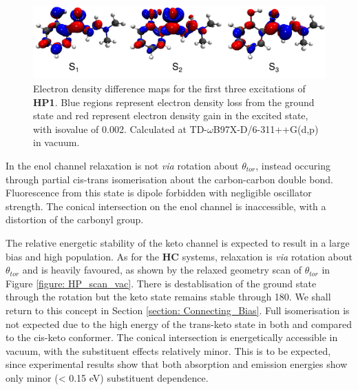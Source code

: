 \begin{figure}[H]
\centering
  \includegraphics[width=0.9\linewidth]{5ConnectingCrystalStructure/monomer_excitations.pdf}
  \caption[Electron density difference maps for the first three excitations of \textbf{HP1}.]{Electron density difference maps for the first three excitations of \textbf{HP1}. Blue regions represent electron density loss from the ground state and red represent electron density gain in the excited state, with isovalue of 0.002. Calculated at TD-$\omega$B97X-D/6-311++G(d,p) in vacuum.}
  \label{figure: monomer_excitations}
\end{figure}
In the enol channel relaxation is not \textit{via} rotation about $\theta_{tor}$, instead occuring through partial cis-trans isomerisation about the carbon-carbon double bond. Fluorescence from this state is dipole forbidden with negligible oscillator strength. The conical intersection on the enol channel is inaccessible, with a distortion of the carbonyl group.

The relative energetic stability of the keto channel is expected to result in a large bias and high population. As for the \textbf{HC} systems, relaxation is \textit{via} rotation about $\theta_{tor}$ and is heavily favoured, as shown by the relaxed geometry scan of $\theta_{tor}$ in Figure \ref{figure: HP_scan_vac}. There is destablisation of the ground state through the rotation but the keto state remains stable through 180\degree{}. We shall return to this concept in Section \ref{section: Connecting_Bias}. Full isomerisation is not expected due to the high energy of the trans-keto state in both \sone{} and \szero{} compared to the cis-keto conformer. The conical intersection is energetically accessible in vacuum, with the substituent effects relatively minor. This is to be expected, since experimental results show that both absorption and emission energies show only minor (\textless{} 0.15 eV) substituent dependence. 

